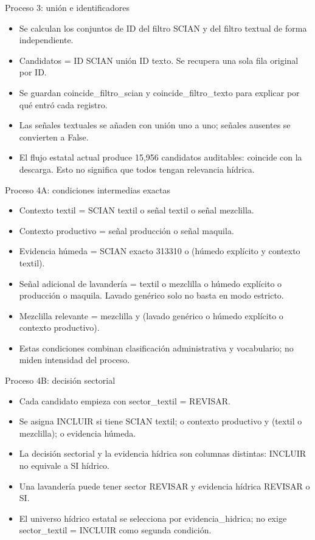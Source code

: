 \documentclass[aspectratio=169,10pt]{beamer}
\begin{document}
\begin{frame}{Proceso 3: unión e identificadores}
\small
\begin{itemize}
\item Se calculan los conjuntos de ID del filtro SCIAN y del filtro textual de forma independiente.
\item Candidatos = ID SCIAN unión ID texto. Se recupera una sola fila original por ID.
\item Se guardan coincide\_filtro\_scian y coincide\_filtro\_texto para explicar por qué entró cada registro.
\item Las señales textuales se añaden con unión uno a uno; señales ausentes se convierten a False.
\item El flujo estatal actual produce 15,956 candidatos auditables: coincide con la descarga. Esto no significa que todos tengan relevancia hídrica.
\end{itemize}
\end{frame}
\begin{frame}{Proceso 4A: condiciones intermedias exactas}
\small
\begin{itemize}
\item Contexto textil = SCIAN textil o señal textil o señal mezclilla.
\item Contexto productivo = señal producción o señal maquila.
\item Evidencia húmeda = SCIAN exacto 313310 o (húmedo explícito y contexto textil).
\item Señal adicional de lavandería = textil o mezclilla o húmedo explícito o producción o maquila. Lavado genérico solo no basta en modo estricto.
\item Mezclilla relevante = mezclilla y (lavado genérico o húmedo explícito o contexto productivo).
\item Estas condiciones combinan clasificación administrativa y vocabulario; no miden intensidad del proceso.
\end{itemize}
\end{frame}
\begin{frame}{Proceso 4B: decisión sectorial}
\small
\begin{itemize}
\item Cada candidato empieza con sector\_textil = REVISAR.
\item Se asigna INCLUIR si tiene SCIAN textil; o contexto productivo y (textil o mezclilla); o evidencia húmeda.
\item La decisión sectorial y la evidencia hídrica son columnas distintas: INCLUIR no equivale a SI hídrico.
\item Una lavandería puede tener sector REVISAR y evidencia hídrica REVISAR o SI.
\item El universo hídrico estatal se selecciona por evidencia\_hidrica; no exige sector\_textil = INCLUIR como segunda condición.
\end{itemize}
\end{frame}
\end{document}
